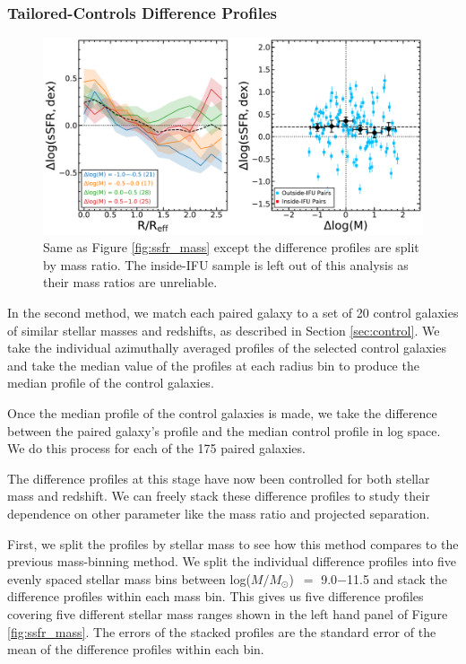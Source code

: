 \documentclass[iop,revtex4,twocolumn,apj,numberedappendix,appendixfloats]{emulateapj}
\newcommand{\logm}{log($M/M_{\odot}$)}
\begin{document}
\subsubsection{Tailored-Controls Difference Profiles}\label{sec:tailored}
\begin{figure}
\centering
\includegraphics[width=\linewidth]{fig/ssfr_dm.pdf}
\caption[]{Same as Figure \ref{fig:ssfr_mass} except the difference profiles are split by mass ratio. The inside-IFU sample is left out of this analysis as their mass ratios are unreliable.}
\label{fig:ssfr_dm}
\end{figure}
In the second method, we match each paired galaxy to a set of 20 control galaxies of similar stellar masses and redshifts, as described in Section \ref{sec:control}. We take the individual azimuthally averaged profiles of the selected control galaxies and take the median value of the profiles at each radius bin to produce the median profile of the control galaxies. 

Once the median profile of the control galaxies is made, we take the difference between the paired galaxy's profile and the median control profile in log space. We do this process for each of the 175 paired galaxies. 

The difference profiles at this stage have now been controlled for both stellar mass and redshift. We can freely stack these difference profiles to study their dependence on other parameter like the mass ratio and projected separation. 

First, we split the profiles by stellar mass to see how this method compares to the previous mass-binning method. We split the individual difference profiles into five evenly spaced stellar mass bins between \logm\ $=$ 9.0$-$11.5 and stack the difference profiles within each mass bin. This gives us five difference profiles covering five different stellar mass ranges shown in the left hand panel of Figure \ref{fig:ssfr_mass}. The errors of the stacked profiles are the standard error of the mean of the difference profiles within each bin.
\end{document}
